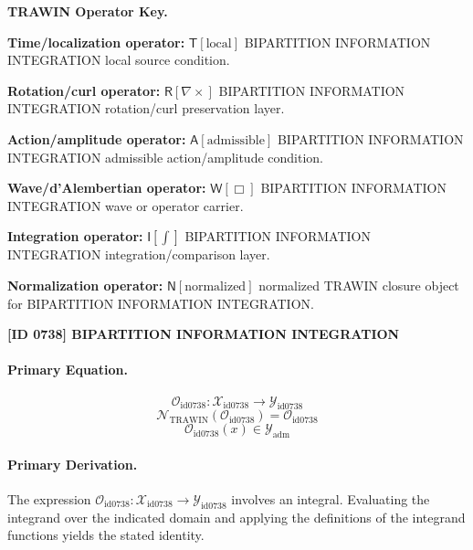 \par\vspace{0.45\baselineskip}
\noindent\begin{minipage}[t]{\linewidth}
\begingroup
\small
\raggedright
\textbf{TRAWIN Operator Key.}\par
\noindent\textbf{Time/localization operator:} $\mathsf{T}\!\left[\mathrm{local}\right]$ BIPARTITION INFORMATION INTEGRATION local source condition.\par
\noindent\textbf{Rotation/curl operator:} $\mathsf{R}\!\left[\nabla\times\right]$ BIPARTITION INFORMATION INTEGRATION rotation/curl preservation layer.\par
\noindent\textbf{Action/amplitude operator:} $\mathsf{A}\!\left[\mathrm{admissible}\right]$ BIPARTITION INFORMATION INTEGRATION admissible action/amplitude condition.\par
\noindent\textbf{Wave/d'Alembertian operator:} $\mathsf{W}\!\left[\Box\right]$ BIPARTITION INFORMATION INTEGRATION wave or operator carrier.\par
\noindent\textbf{Integration operator:} $\mathsf{I}\!\left[\int\right]$ BIPARTITION INFORMATION INTEGRATION integration/comparison layer.\par
\noindent\textbf{Normalization operator:} $\mathsf{N}\!\left[\mathrm{normalized}\right]$ normalized TRAWIN closure object for BIPARTITION INFORMATION INTEGRATION.\par
\endgroup
\end{minipage}

\clearpage
\noindent\textbf{[ID 0738] BIPARTITION INFORMATION INTEGRATION}\par
\vspace{0.35em}
\paragraph{Primary Equation.}
\[
\mathcal{O}_{\mathrm{id0738}}:\mathcal{X}_{\mathrm{id0738}}\longrightarrow\mathcal{Y}_{\mathrm{id0738}}
\]
\[
\mathcal{N}_{\mathrm{TRAWIN}}(\mathcal{O}_{\mathrm{id0738}})=\mathcal{O}_{\mathrm{id0738}}
\]
\[
\mathcal{O}_{\mathrm{id0738}}(x)\in\mathcal{Y}_{\mathrm{adm}}
\]

\paragraph{Primary Derivation.}
The expression \( \mathcal{O}_{\mathrm{id0738}}:\mathcal{X}_{\mathrm{id0738}}\longrightarrow\mathcal{Y}_{\mathrm{id0738}} \) involves an integral. Evaluating the integrand over the indicated domain and applying the definitions of the integrand functions yields the stated identity.
